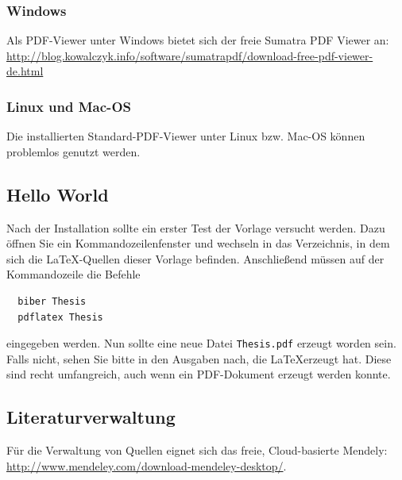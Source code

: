 \subsubsection{Windows}

Als PDF-Viewer unter Windows bietet sich der freie Sumatra PDF Viewer an: \url{http://blog.kowalczyk.info/software/sumatrapdf/download-free-pdf-viewer-de.html}

\subsubsection{Linux und Mac-OS}

Die installierten Standard-PDF-Viewer unter Linux bzw. Mac-OS können problemlos genutzt werden.

\subsection{Hello World}
Nach der Installation sollte ein erster Test der Vorlage versucht werden. Dazu öffnen Sie ein Kommandozeilenfenster und wechseln in das Verzeichnis, in dem sich die {\LaTeX}-Quellen dieser Vorlage befinden. Anschließend müssen auf der Kommandozeile die Befehle 
\begin{lstlisting}
  biber Thesis
  pdflatex Thesis
\end{lstlisting}
eingegeben werden. Nun sollte eine neue Datei {\tt Thesis.pdf} erzeugt worden sein. Falls nicht, sehen Sie bitte in den Ausgaben nach, die \LaTeX erzeugt hat. Diese sind recht umfangreich, auch wenn ein PDF-Dokument erzeugt werden konnte.


\subsection{Literaturverwaltung}

Für die Verwaltung von Quellen eignet sich das freie, Cloud-basierte Mendely: \url{http://www.mendeley.com/download-mendeley-desktop/}. 

